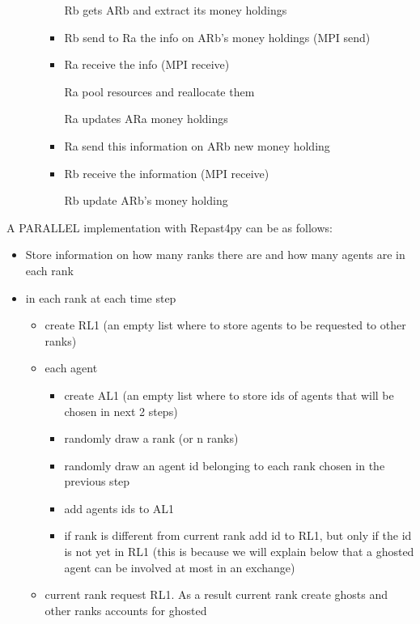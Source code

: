 \documentclass{article}
\providecommand{\tightlist}{%
  \setlength{\itemsep}{0pt}\setlength{\parskip}{0pt}}
\begin{document}
\begin{itemize}
\begin{itemize}
\begin{itemize}
	    Rb gets ARb and extract its money holdings
    \item
	    Rb send to Ra the info on ARb's money holdings (MPI send)
    \item
	    Ra receive the info (MPI receive)

	    Ra pool resources and reallocate them

	    Ra updates ARa money holdings
    \item
	    Ra send this information on ARb new money holding
    \item
	    Rb receive the information (MPI receive)

	    Rb update ARb's money holding
    \end{itemize}
  \end{itemize}
\end{itemize}

A PARALLEL implementation with Repast4py can be as follows:

\begin{itemize}
\tightlist
\item
  Store information on how many ranks there are and how many agents are
  in each rank
\item
  in each rank at each time step

  \begin{itemize}
  \tightlist
  \item
    create RL1 (an empty list where to store agents to be requested to
    other ranks)
  \item
    each agent

    \begin{itemize}
    \tightlist
    \item
      create AL1 (an empty list where to store ids of agents that will
      be chosen in next 2 steps)
    \item
      randomly draw a rank (or n ranks)
    \item
      randomly draw an agent id belonging to each rank chosen in the
      previous step
    \item
      add agents ids to AL1
    \item
      if rank is different from current rank add id to RL1, but only if
      the id is not yet in RL1 (this is because we will explain below
      that a ghosted agent can be involved at most in an exchange)
    \end{itemize}
  \item
    current rank request RL1. As a result current rank create ghosts and
    other ranks accounts for ghosted
  \end{itemize}
\end{itemize}
\end{document}
